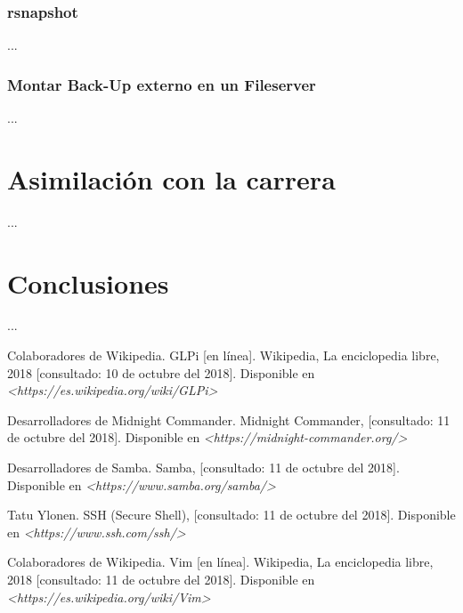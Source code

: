 \documentclass[12pt,a4paper]{article}
\begin{document}
\subsubsection{rsnapshot} %
...

\subsubsection{Montar Back-Up externo en un Fileserver}
...

\section{Asimilación con la carrera}
...

\section{Conclusiones}
...

\cleardoublepage
\begin{thebibliography}{9}
Colaboradores de Wikipedia. GLPi [en línea]. Wikipedia, La enciclopedia libre, 2018 [consultado: 10 de octubre del 2018]. Disponible en \textit{<https://es.wikipedia.org/wiki/GLPi>}

Desarrolladores de Midnight Commander. Midnight Commander, [consultado: 11 de octubre del 2018]. Disponible en \textit{<https://midnight-commander.org/>}  

Desarrolladores de Samba. Samba, [consultado: 11 de octubre del 2018]. Disponible en \textit{<https://www.samba.org/samba/>}  

Tatu Ylonen. SSH (Secure Shell), [consultado: 11 de octubre del 2018]. Disponible en \textit{<https://www.ssh.com/ssh/>}  

Colaboradores de Wikipedia. Vim [en línea]. Wikipedia, La enciclopedia libre, 2018 [consultado: 11 de octubre del 2018]. Disponible en \textit{<https://es.wikipedia.org/wiki/Vim>}



\end{thebibliography}
\end{document}
